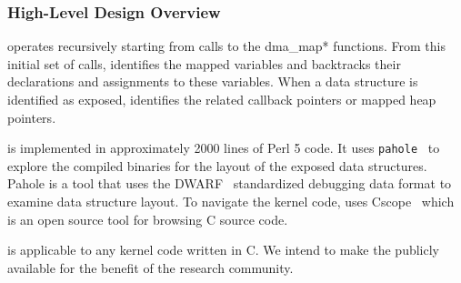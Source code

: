 

\subsubsection{High-Level Design Overview}

\tool operates recursively starting from calls to the dma\_map* functions. From this initial set of calls, \tool identifies the mapped variables and backtracks their declarations and assignments to these variables. When a data structure is identified as exposed, \tool identifies the related callback pointers or mapped heap pointers. 



\tool is implemented in approximately 2000 lines of Perl 5 code. It uses \texttt{pahole}~\cite{dwarves} to explore the compiled binaries for the layout of the exposed data structures. Pahole is a tool that uses the DWARF~\cite{dwarf} standardized debugging data format to examine data structure layout. To navigate the kernel code, \tool uses Cscope~\cite{cscope,cscope_92} which is an open source tool for browsing C source code.

\tool is applicable to any kernel code written in C. We intend to make the \tool publicly available for the benefit of the research community.


